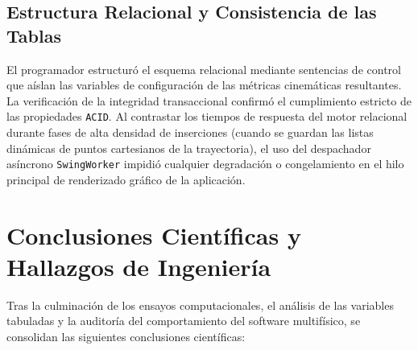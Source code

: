 \documentclass[11pt,a4paper]{article}
\begin{document}
	\subsection{Estructura Relacional y Consistencia de las Tablas}
	El programador estructuró el esquema relacional mediante sentencias de control que aíslan las variables de configuración de las métricas cinemáticas resultantes. La verificación de la integridad transaccional confirmó el cumplimiento estricto de las propiedades \texttt{ACID}. Al contrastar los tiempos de respuesta del motor relacional durante fases de alta densidad de inserciones (cuando se guardan las listas dinámicas de puntos cartesianos de la trayectoria), el uso del despachador asíncrono \texttt{SwingWorker} impidió cualquier degradación o congelamiento en el hilo principal de renderizado gráfico de la aplicación.
	
	\section{Conclusiones Científicas y Hallazgos de Ingeniería}
	Tras la culminación de los ensayos computacionales, el análisis de las variables tabuladas y la auditoría del comportamiento del software multifísico, se consolidan las siguientes conclusiones científicas:
	
\end{document}
